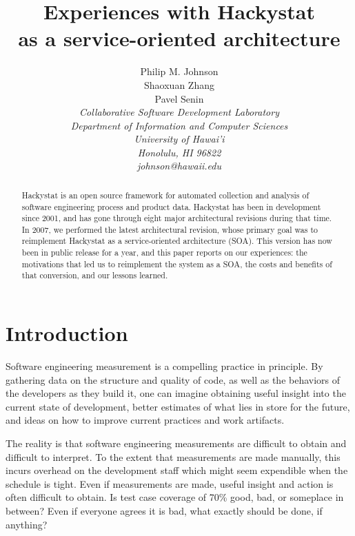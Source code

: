 \documentclass[conference,compsoc]{IEEEtran}
\begin{document}
\title{Experiences with Hackystat \\ as a service-oriented architecture}

\author{Philip M. Johnson \\
        Shaoxuan Zhang \\
        Pavel Senin \\
\em  Collaborative Software Development Laboratory \\
      Department of Information and Computer Sciences \\
      University of Hawai'i \\
      Honolulu, HI 96822 \\
      johnson@hawaii.edu \\
}


\maketitle

\begin{abstract}  %
Hackystat is an open source framework for automated collection and analysis
of software engineering process and product data.  Hackystat has been in
development since 2001, and has gone through eight major architectural
revisions during that time.  In 2007, we performed the latest architectural
revision, whose primary goal was to reimplement Hackystat as a
service-oriented architecture (SOA).  This version has now been in
public release for a year, and this paper reports on our experiences:
the motivations that led us to reimplement the system as a SOA, the
costs and benefits of that conversion, and our lessons learned. 
\end{abstract}


\section{Introduction}
\label{sec:intro}

Software engineering measurement is a compelling practice in principle. By
gathering data on the structure and quality of code, as well as the
behaviors of the developers as they build it, one can imagine obtaining
useful insight into the current state of development, better estimates of
what lies in store for the future, and ideas on how to improve current
practices and work artifacts.

The reality is that software engineering measurements are difficult to
obtain and difficult to interpret. To the extent that measurements are made
manually, this incurs overhead on the development staff which might seem
expendible when the schedule is tight.  Even if measurements are made,
useful insight and action is often difficult to obtain.  Is test case coverage of 70\%
good, bad, or someplace in between? Even if everyone agrees it is bad, what
exactly should be done, if anything?
\end{document}
